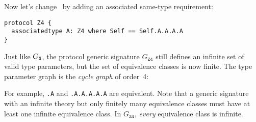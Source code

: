 \documentclass[../generics]{subfiles}
\begin{document}
\begin{example}\label{protocol z4 graph}  Now let's change \tN\ by adding an associated same-type requirement:
\begin{Verbatim}
protocol Z4 {
  associatedtype A: Z4 where Self == Self.A.A.A.A
}
\end{Verbatim}
Just like $G_{\texttt{N}}$, the protocol generic signature $G_\texttt{Z4}$ still defines an infinite set of valid type parameters, but the set of equivalence classes is now finite. The type parameter graph is the \emph{cycle graph} of order~4:
\begin{center}
\end{center}
For example, \texttt{.A} and \texttt{.A.A.A.A.A} are equivalent. Note that a generic signature with an infinite theory but only finitely many equivalence classes must have at least one infinite equivalence class. In $G_\texttt{Z4}$, \emph{every} equivalence class is infinite.
\end{example}
\end{document}

